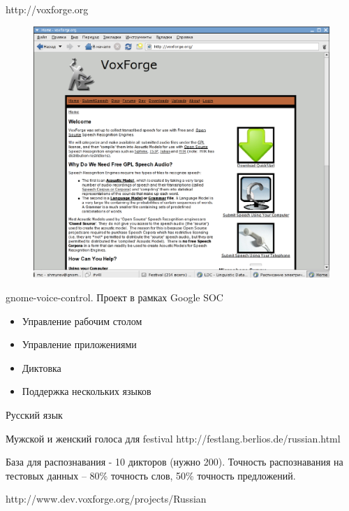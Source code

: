 \documentclass{seminar}
\begin{document}
\begin{slide}

http://voxforge.org

\begin{figure}
\begin{center}
\includegraphics[width=.7\textwidth]{./images/voxforge.eps}
\end{center}
\end{figure}

\end{slide}


\begin{slide}
gnome-voice-control. Проект в рамках Google SOC

\begin{itemize}
\item Управление рабочим столом
\item Управление приложениями
\item Диктовка
\item Поддержка нескольких языков
\end{itemize}

\end{slide}

\begin{slide}
Русский язык
 
Мужской и женский голоса для festival http://festlang.berlios.de/russian.html

База для распознавания - 10 дикторов (нужно 200). Точность распознавания
на тестовых данных -- 80\% точность слов, 50\% точность предложений.

http://www.dev.voxforge.org/projects/Russian

\end{slide}
\end{document}
